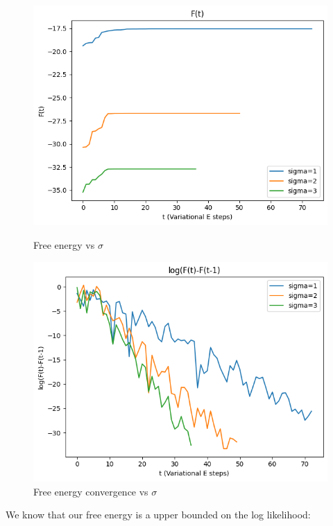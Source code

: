 \documentclass[12pt]{article}
\begin{document}
\begin{figure}[h]
\centering
\begin{minipage}{.5\textwidth}
  \centering
\includegraphics[scale=0.4]{outputs/q3/g-free-energy-sigma}
\caption{Free energy vs $\sigma$}
\label{fig:3g-free-energy-diff-sigma}
\end{minipage}%
\begin{minipage}{.5\textwidth}
  \centering
\includegraphics[scale=0.4]{outputs/q3/g-free-energy-diff-sigma}
\caption{Free energy convergence vs $\sigma$}
\label{fig:3g-free-energy-diff-sigma}
\end{minipage}
\end{figure}

We know that our free energy is a upper bounded on the log likelihood:
\end{document}
